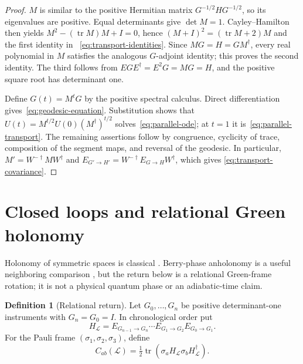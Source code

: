 \documentclass[12pt]{article}
\theoremstyle{definition}
\newtheorem{definition}[theorem]{Definition}
\theoremstyle{remark}
\newcommand{\tr}{\operatorname{tr}}
\begin{document}
\begin{proof}
$M$ is similar to the positive Hermitian matrix
$G^{-1/2}HG^{-1/2}$, so its eigenvalues are positive.  Equal determinants
give $\det M=1$.  Cayley--Hamilton then yields
$M^2-(\tr M)M+I=0$, hence
$(M+I)^2=(\tr M+2)M$ and the first identity in
~\eqref{eq:transport-identities}.  Since $MG=H=GM^\dagger$, every real
polynomial in $M$ satisfies the analogous $G$-adjoint identity; this proves
the second identity.  The third follows from
$EGE^\dagger=E^2G=MG=H$, and the positive square root has determinant one.

Define $G(t)=M^tG$ by the positive spectral calculus.  Direct differentiation
gives~\eqref{eq:geodesic-equation}.  Substitution shows that
$U(t)=M^{t/2}U(0)(M^\dagger)^{t/2}$ solves~\eqref{eq:parallel-ode};
at $t=1$ it is~\eqref{eq:parallel-transport}.  The remaining assertions
follow by congruence, cyclicity of trace, composition of the segment maps,
and reversal of the geodesic.  In particular,
$M'=W^{-\dagger}MW^\dagger$ and
$E_{G'\to H'}=W^{-\dagger}E_{G\to H}W^\dagger$, which gives
\eqref{eq:transport-covariance}.
\end{proof}

\section{Closed loops and relational Green holonomy}\label{sec:holonomy}

Holonomy of symmetric spaces is classical
\cite{KobayashiNomizu1963,AmbroseSinger1953}.  Berry-phase anholonomy is a
useful neighboring comparison \cite{Berry1984}, but the return below is a
relational Green-frame rotation; it is not a physical quantum phase or an
adiabatic-time claim.

\begin{definition}[Relational return]\label{def:relational-return}
Let $G_0,\ldots,G_n$ be positive determinant-one instruments with
$G_n=G_0=I$.  In chronological order put
\begin{equation}\label{eq:loop-spin}
 H_{\mathcal L}
 =E_{G_{n-1}\to G_n}\cdots E_{G_1\to G_2}E_{G_0\to G_1}.
\end{equation}
For the Pauli frame $(\sigma_1,\sigma_2,\sigma_3)$, define
\begin{equation}\label{eq:return-action}
 C_{ab}(\mathcal L)
 =\tfrac12\tr\!\left(
 \sigma_aH_{\mathcal L}\sigma_bH_{\mathcal L}^{\dagger}\right).
\end{equation}
\end{definition}
\end{document}
